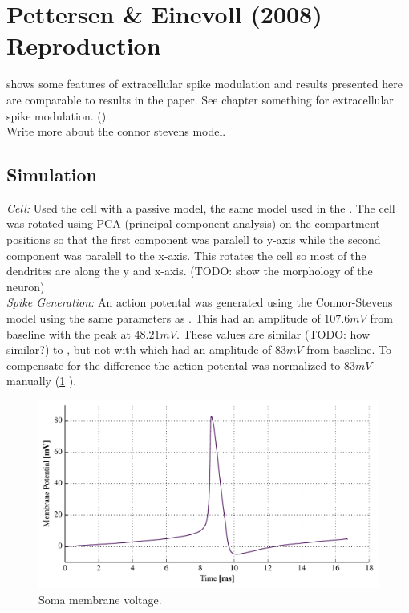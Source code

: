 \documentclass[altfont, fleqn]{uiophd}
\let\mycref\cref
\renewcommand{\cref}[1]{{\color{viridis_03}\mycref{#1}} }
\begin{document}
\section{Pettersen \& Einevoll (2008) Reproduction}
\textcite{pettersen_amplitude_2008} shows some features of extracellular 
spike modulation and
results presented here are comparable to results in the paper. 
See chapter something for extracellular spike modulation.
(\cite{pettersen_amplitude_2008}) \\

Write more about the connor stevens model.

\subsection{Simulation}
\emph{Cell:}
Used the \textcite{mainen_influence_1996} cell with a passive model, 
the same model used in the \textcite{pettersen_amplitude_2008}. 
The cell was rotated using PCA (principal component analysis) on the compartment
positions
so that the first component was paralell to y-axis while the second component
was paralell to the x-axis. This rotates the cell so most of the dendrites are along
the y and x-axis. (TODO: show the morphology of the neuron)\\

\noindent\emph{Spike Generation:}
An action potental was generated using the Connor-Stevens model 
\cites{connor_prediction_1971, connor_neural_1977}
using the same parameters as \textcite{dayan_theoretical_2001}. 
This had an amplitude of $107.6mV$ from baseline with the peak at $48.21mV$. 
These values are similar (TODO: how similar?) to \textcite{dayan_theoretical_2001}, but not
with \textcite{pettersen_amplitude_2008} which had an amplitude of 
$83mV$ from baseline. To compensate for the difference the action potental was 
normalized to $83mV$ manually (\cref{fig:3_1_soma_mem}).
\\

\begin{figure}[h]
\centering
\includegraphics[width=1\textwidth]{images/3_methods/3_1_reproduction/soma_mem.pdf}
\caption{Soma membrane voltage. }
\label{fig:3_1_soma_mem}
\end{figure}
\end{document}
